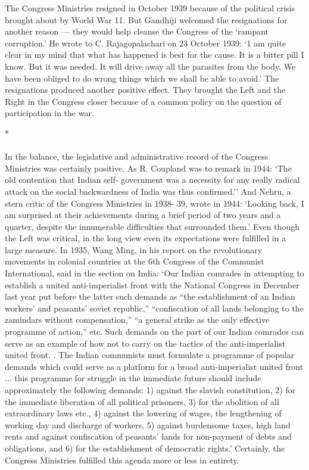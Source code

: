 \begin{multicols}{2}
The Congress Ministries resigned in October 1939 because of the political crisis brought about by World War 11. But Gandhiji welcomed the resignations for another reason --- they would help cleanse the Congress of the `rampant corruption.' He wrote to C. Rajagopalachari on 23 October 1939: `1 am quite clear in my mind that what has happened is best for the cause. It is a bitter pill I know. But it was needed. It will drive away all the parasites from the body. We have been obliged to do wrong things which we shall be able to avoid.' The resignations produced another positive effect. They brought the Left and the Right in the Congress closer because of a common policy on the question of participation in the war.

\begin{center}*\end{center}

\paragraph*{}

In the balance, the legislative and administrative record of the Congress Ministries was certainly positive. As R. Coupland was to remark in 1944: `The old contention that Indian self- government was a necessity for any really radical attack on the social backwardness of India was thus confirmed.'' And Nehru, a stern critic of the Congress Ministries in 1938- 39, wrote in 1944: `Looking back, I am surprised at their achievements during a brief period of two years and a quarter, despite the innumerable difficulties that surrounded them.' Even though the Left was critical, in the long view even its expectations were fulfilled in a large measure. In 1935, Wang Ming, in his report on the revolutionary movements in colonial countries at the 6th Congress of the Communist International, said in the section on India: `Our Indian comrades in attempting to establish a united anti-imperialist front with the National Congress in December last year put before the latter such demands as ``the establishment of an Indian workers' and peasants' soviet republic,'' ``confiscation of all lands belonging to the zamindars without compensation,'' ``a general strike as the only effective programme of action,'' etc. Such demands on the part of our Indian comrades can serve as an example of how not to carry on the tactics of the anti-imperialist united front. . The Indian communists must formulate a programme of popular demands which could serve as a platform for a broad anti-imperialist united front ... this programme for struggle in the immediate future should include approximately the following demands: 1) against the slavish constitution, 2) for the immediate liberation of all political prisoners, 3) for the abolition of all extraordinary laws etc., 4) against the lowering of wages, the lengthening of working day and discharge of workers, 5) against burdensome taxes, high land rents and against confiscation of peasants' lands for non-payment of debts and obligations, and 6) for the establishment of democratic rights.' Certainly, the Congress Ministries fulfilled this agenda more or less in entirety. 


\end{multicols}
